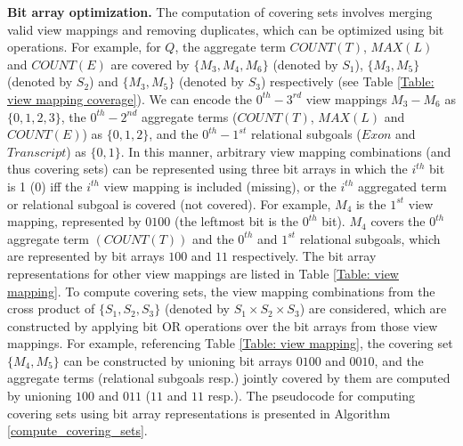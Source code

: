 \textbf{Bit array optimization.} The computation of covering sets involves merging valid view mappings and removing duplicates, which can be optimized using bit operations. For example, for $Q$, the aggregate term $COUNT(T)$, $MAX(L)$ and $COUNT(E)$ are covered by $\{M_3, M_4, M_6\}$ (denoted by $S_1$), $\{M_3, M_5\}$ (denoted by $S_2$) and $\{M_3, M_5\}$ (denoted by $S_3$) respectively (see Table \ref{Table: view mapping coverage}). We can encode the $0^{th}-3^{rd}$ view mappings $M_3-M_6$ as $\{0,1,2,3\}$, the $0^{th}-2^{nd}$ aggregate terms ($COUNT(T)$, $MAX(L)$ and $COUNT(E)$) as $\{0, 1, 2\}$, and the $0^{th}-1^{st}$ relational subgoals ($Exon$ and $Transcript$) as $\{0, 1\}$.  In this manner, arbitrary view mapping combinations (and thus covering sets) can be represented using three bit arrays in which the $i^{th}$ bit is 1 (0) iff the $i^{th}$ view mapping is included (missing), or the $i^{th}$ aggregated term or relational subgoal is covered (not covered). 
For example, $M_4$ is the $1^{st}$ view mapping, represented by $0100$ (the leftmost bit is the $0^{th}$ bit). $M_4$ covers the $0^{th}$ aggregate term $(COUNT(T))$ and the $0^{th}$ and $1^{st}$ relational subgoals, which are represented by bit arrays $100$ and $11$ respectively. The bit array representations for other view mappings are listed in Table \ref{Table: view mapping}. To compute covering sets, the view mapping combinations from the cross product of $\{S_1, S_2, S_3\}$ (denoted by $S_1 \times S_2 \times S_3$) are considered, which are constructed by applying bit OR operations over the bit arrays from those view mappings. For example, referencing Table \ref{Table: view mapping}, the covering set $\{M_4, M_5\}$ can be constructed by unioning bit arrays $0100$ and $0010$, and the aggregate terms (relational subgoals resp.) jointly covered by them are computed by unioning $100$ and $011$ ($11$ and $11$ resp.). The pseudocode for computing covering sets using bit array representations is presented in Algorithm \ref{compute_covering_sets}.


